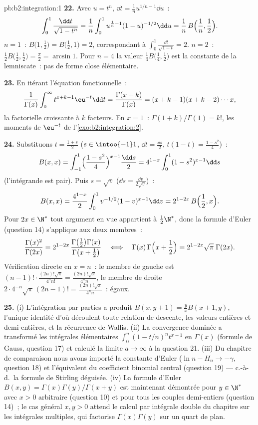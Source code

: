 \begin{solution}{pb:b2:integration:1}
\textbf{22.} Avec $u = t^n$, $\dd t = \frac1n u^{1/n - 1}\dd
u$~:
\[
\int_0^1 \frac{\dd t}{\sqrt{1-t^n}}
= \frac1n\int_0^1 u^{\frac1n-1}(1-u)^{-1/2}\dd u
= \frac1n\,B\Bigl(\frac1n, \frac12\Bigr) .
\]
$n = 1$~: $B\bigl(1,\frac12\bigr) = B\bigl(\frac12,1\bigr) = 2$,
correspondant à $\int_0^1\frac{\dd t}{\sqrt{1-t}} = 2$. $n = 2$~:
$\frac12 B\bigl(\frac12,\frac12\bigr) = \frac\pi2 = \arcsin 1$.
Pour $n = 4$ la valeur $\frac14 B\bigl(\frac14,\frac12\bigr)$ est
la constante de la lemniscate~: pas de forme close élémentaire.

\textbf{23.} En itérant l'équation fonctionnelle~:
\[
\frac{1}{\Gamma(x)}\int_0^\infty t^{x+k-1}\eu^{-t}\dd t
= \frac{\Gamma(x+k)}{\Gamma(x)}
= (x+k-1)(x+k-2)\cdots x ,
\]
la factorielle croissante à $k$ facteurs. En $x = 1$~:
$\Gamma(1+k)/\Gamma(1) = k!$, les moments de $\eu^{-t}$ de
l'\cref{exo:b2:integration:2}.

\textbf{24.} Substituons $t = \frac{1+s}2$ ($s \in
\intoo{-1}1$, $\dd t = \frac{\dd s}2$, $t(1-t) =
\frac{1-s^2}4$)~:
\[
B(x,x) = \int_{-1}^{1}\Bigl(\frac{1-s^2}{4}\Bigr)^{x-1}
\frac{\dd s}{2}
= 4^{1-x}\int_0^1 (1-s^2)^{x-1}\dd s
\]
(l'intégrande est pair). Puis $s = \sqrt v$ ($\dd s =
\frac{\dd v}{2\sqrt v}$)~:
\[
B(x,x) = \frac{4^{1-x}}{2}\int_0^1
v^{-1/2}(1-v)^{x-1}\dd v
= 2^{1-2x}\,B\Bigl(\frac12, x\Bigr) .
\]
Pour $2x \in \N^*$ tout argument en vue appartient à
$\frac12\N^*$, donc la formule d'Euler (question 14) s'applique aux deux
membres~:
\[
\frac{\Gamma(x)^2}{\Gamma(2x)}
= 2^{1-2x}\,
\frac{\Gamma\bigl(\frac12\bigr)\Gamma(x)}
{\Gamma\bigl(x+\frac12\bigr)}
\quad\Longleftrightarrow\quad
\Gamma(x)\,\Gamma\Bigl(x+\frac12\Bigr)
= 2^{1-2x}\sqrt\pi\;\Gamma(2x) .
\]
Vérification directe en $x = n$~: le membre de gauche est $(n-1)!\cdot
\frac{(2n)!\sqrt\pi}{4^n n!} = \frac{(2n)!\sqrt\pi}{4^n n}$,
le membre de droite $2\cdot4^{-n}\sqrt\pi\,(2n-1)! =
\frac{(2n)!\sqrt\pi}{4^n n}$~: égaux.

\textbf{25.} (i) L'intégration par parties a produit $B(x,y+1) =
\frac yx B(x+1,y)$, l'unique identité d'où découlent toute
relation de descente, les valeurs entières et demi-entières, et la
récurrence de Wallis. (ii) La convergence dominée a transformé les
intégrales élémentaires $\int_0^n(1-t/n)^n t^{x-1}$ en
$\Gamma(x)$ (formule de Gauss, question 17) et calculé la
limite $a \to \infty$ à la question 21. (iii) Du chapitre de comparaison
nous avons importé la constante d'Euler ($\ln n - H_n \to
-\gamma$, question 18) et l'équivalent du coefficient binomial central
(question 19) --- c.-à-d.\ la formule de Stirling déguisée. (iv)
La formule d'Euler $B(x,y) = \Gamma(x)\Gamma(y)/\Gamma(x+y)$ est
maintenant démontrée pour $y \in \N^*$ avec $x > 0$ arbitraire (question
10) et pour tous les couples demi-entiers (question 14)~; le cas
général $x, y > 0$ attend le calcul par intégrale double du
chapitre sur les intégrales multiples, qui factorise
$\Gamma(x)\Gamma(y)$ sur un quart de plan.
\end{solution}
